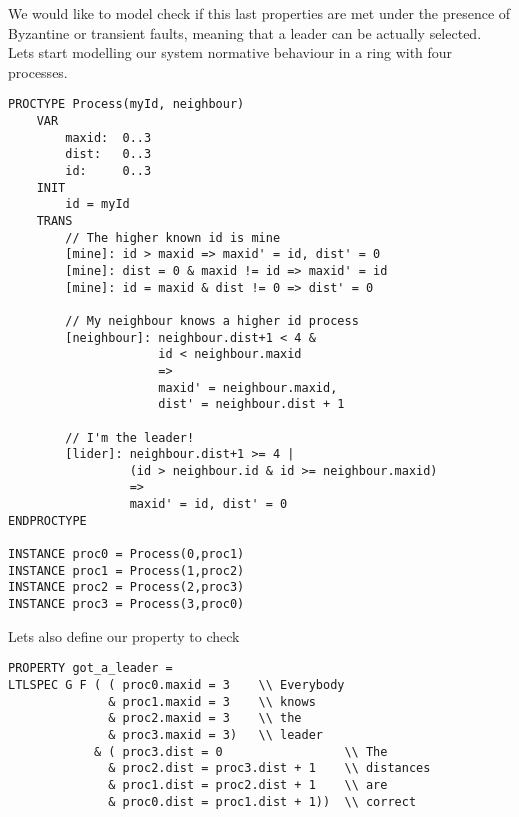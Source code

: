 \documentclass[12pt]{llncs2e/llncs}
\begin{document}
We would like to model check if this last properties are met under the presence of Byzantine or transient faults, meaning that a leader can be actually selected.\\
Lets start modelling our system normative behaviour in a ring with four processes.
\begin{framed}
\begin{verbatim}
PROCTYPE Process(myId, neighbour)
    VAR
        maxid:  0..3
        dist:   0..3
        id:     0..3
    INIT
        id = myId
    TRANS
        // The higher known id is mine
        [mine]: id > maxid => maxid' = id, dist' = 0
        [mine]: dist = 0 & maxid != id => maxid' = id
        [mine]: id = maxid & dist != 0 => dist' = 0

        // My neighbour knows a higher id process
        [neighbour]: neighbour.dist+1 < 4 &
                     id < neighbour.maxid
                     =>
                     maxid' = neighbour.maxid,
                     dist' = neighbour.dist + 1

        // I'm the leader!
        [lider]: neighbour.dist+1 >= 4 | 
                 (id > neighbour.id & id >= neighbour.maxid)
                 =>
                 maxid' = id, dist' = 0
ENDPROCTYPE

INSTANCE proc0 = Process(0,proc1)
INSTANCE proc1 = Process(1,proc2)
INSTANCE proc2 = Process(2,proc3)
INSTANCE proc3 = Process(3,proc0)
\end{verbatim}
\end{framed}
Lets also define our property to check
\begin{framed}
\begin{verbatim}
PROPERTY got_a_leader =
LTLSPEC G F ( ( proc0.maxid = 3    \\ Everybody
              & proc1.maxid = 3    \\ knows
              & proc2.maxid = 3    \\ the
              & proc3.maxid = 3)   \\ leader
            & ( proc3.dist = 0                 \\ The
              & proc2.dist = proc3.dist + 1    \\ distances
              & proc1.dist = proc2.dist + 1    \\ are
              & proc0.dist = proc1.dist + 1))  \\ correct

\end{verbatim}
\end{framed}
\end{document}

